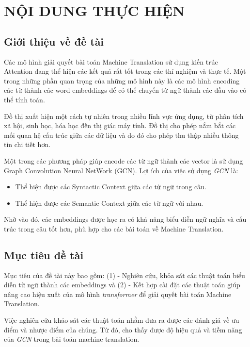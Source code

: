 \documentclass{article}[14pt]
\begin{document}
    \section{NỘI DUNG THỰC HIỆN}
    {

    
    \subsection{Giới thiệu về đề tài}
    
    Các mô hình giải quyết bài toán Machine Translation sử dụng kiến trúc Attention đang thể hiện các kết quả rất tốt trong các thí nghiệm và thực tế. Một trong những phần quan trọng của những mô hình này là các mô hình encoding các từ thành các word embeddings để có thể chuyển từ ngữ thành các đầu vào có thể tính toán.

    Đồ thị xuất hiện một cách tự nhiên trong nhiều lĩnh vực ứng dụng, từ phân tích xã hội, sinh học, hóa học đến thị giác máy tính. Đồ thị cho phép nắm bắt các mối quan hệ cấu trúc giữa các dữ liệu và do đó cho phép thu thập nhiều thông tin chi tiết hơn.

    Một trong các phương pháp giúp encode các từ ngữ thành các vector là sử dụng Graph Convolution Neural NetWork (GCN). Lợi ích của việc sử dụng \textit{GCN} là: 
    \begin{itemize}
        \item Thể hiện được các Syntactic Context giữa các từ ngữ trong câu.
        \item Thể hiện được các Semantic Context giữa các từ ngữ với nhau.
    \end{itemize}
    Nhờ vào đó, các embeddings được học ra có khả năng biểu diễn ngữ nghĩa và cấu trúc trong câu tốt hơn, phù hợp cho các bài toán về Machine Translation.
   
    \subsection{Mục tiêu đề tài}
    
    Mục tiêu của đề tài này bao gồm: (1) - Nghiên cứu, khỏa sát các thuật toán biểu diễn từ ngữ thành các embeddings và (2) - Kết hợp cài đặt các thuật toán giúp nâng cao hiệu xuất của mô hình  \textit{transformer}  để giải quyết bài toán Machine Translation.

    Việc nghiên cứu khảo sát các thuật toán nhằm đưa ra được các đánh giá về ưu điểm và nhược điểm của chúng. Từ đó, cho thấy được độ hiệu quả và tiềm năng của \textit{GCN} trong bài toán machine translation.

}
\end{document}
